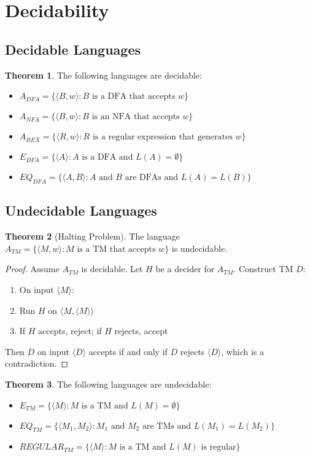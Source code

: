 \documentclass[11pt]{article}
\theoremstyle{definition}
\newtheorem{theorem}{Theorem}[section]
\begin{document}
\section{Decidability}

\subsection{Decidable Languages}
\begin{theorem}
The following languages are decidable:
\begin{itemize}
    \item $A_{DFA} = \{\langle B, w \rangle : B \text{ is a DFA that accepts } w\}$
    \item $A_{NFA} = \{\langle B, w \rangle : B \text{ is an NFA that accepts } w\}$
    \item $A_{REX} = \{\langle R, w \rangle : R \text{ is a regular expression that generates } w\}$
    \item $E_{DFA} = \{\langle A \rangle : A \text{ is a DFA and } L(A) = \emptyset\}$
    \item $EQ_{DFA} = \{\langle A, B \rangle : A \text{ and } B \text{ are DFAs and } L(A) = L(B)\}$
\end{itemize}
\end{theorem}

\subsection{Undecidable Languages}
\begin{theorem}[Halting Problem]
The language $A_{TM} = \{\langle M, w \rangle : M \text{ is a TM that accepts } w\}$ is undecidable.
\end{theorem}

\begin{proof}
Assume $A_{TM}$ is decidable. Let $H$ be a decider for $A_{TM}$. Construct TM $D$:
\begin{enumerate}
    \item On input $\langle M \rangle$:
    \item Run $H$ on $\langle M, \langle M \rangle \rangle$
    \item If $H$ accepts, reject; if $H$ rejects, accept
\end{enumerate}
Then $D$ on input $\langle D \rangle$ accepts if and only if $D$ rejects $\langle D \rangle$, which is a contradiction.
\end{proof}

\begin{theorem}
The following languages are undecidable:
\begin{itemize}
    \item $E_{TM} = \{\langle M \rangle : M \text{ is a TM and } L(M) = \emptyset\}$
    \item $EQ_{TM} = \{\langle M_1, M_2 \rangle : M_1 \text{ and } M_2 \text{ are TMs and } L(M_1) = L(M_2)\}$
    \item $REGULAR_{TM} = \{\langle M \rangle : M \text{ is a TM and } L(M) \text{ is regular}\}$
\end{itemize}
\end{theorem}
\end{document}
